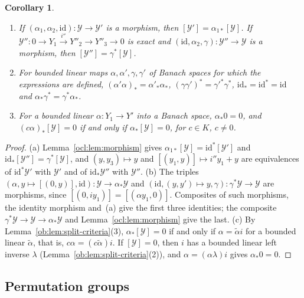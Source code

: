 \documentclass[11pt]{amsart}
\newtheorem{corollary}[theorem]{Corollary}
\theoremstyle{definition}
\theoremstyle{remark}
\numberwithin{equation}{section}
\newcommand{\id}{\mathrm{id}}
\theoremstyle{plain}
\theoremstyle{definition}
\theoremstyle{plain}
\begin{document}
\begin{corollary}\label{ocl:cor:functorial}
\begin{enumerate}
\item[(a)] If $(\alpha_1,\alpha_2,\id)\colon\mathcal Y\to\mathcal Y'$ is a morphism, then $[\mathcal
Y']=\alpha_{1*}[\mathcal Y]$. If $\mathcal Y''\colon0\to Y_1\xrightarrow{i''}Y''_2\to Y''_3\to0$ is exact and
$(\id,\alpha_2,\gamma)\colon\mathcal Y''\to\mathcal Y$ is a morphism, then $[\mathcal Y'']=\gamma^*[\mathcal Y]$.
\item[(b)] For bounded linear maps $\alpha,\alpha',\gamma,\gamma'$ of Banach spaces for which the expressions are defined,
$(\alpha'\alpha)_*=\alpha'_*\alpha_*$, $(\gamma\gamma')^*=\gamma'^*\gamma^*$, $\id_*=\id^*=\id$ and
$\alpha_*\gamma^*=\gamma^*\alpha_*$.
\item[(c)] For a bounded linear $\alpha\colon Y_1\to Y'$ into a Banach space, $\alpha_*0=0$, and $(c\alpha)_*[\mathcal
Y]=0$ if and only if $\alpha_*[\mathcal Y]=0$, for $c\in K$, $c\ne0$.
\end{enumerate}
\end{corollary}

\begin{proof}
(a) Lemma~\ref{ocl:lem:morphism} gives $\alpha_{1*}[\mathcal Y]=\id^*[\mathcal Y']$ and $\id_*[\mathcal
Y'']=\gamma^*[\mathcal Y]$, and $(y,y_3)\mapsto y$ and $[(y_1,y)]\mapsto i''y_1+y$ are equivalences of $\id^*\mathcal
Y'$ with $\mathcal Y'$ and of $\id_*\mathcal Y''$ with $\mathcal Y''$. (b) The triples
$(\alpha,y\mapsto[(0,y)],\id)\colon\mathcal Y\to\alpha_*\mathcal Y$ and $(\id,(y,y')\mapsto
y,\gamma)\colon\gamma^*\mathcal Y\to\mathcal Y$ are morphisms, since $[(0,iy_1)]=[(\alpha y_1,0)]$. Composites of such
morphisms, the identity morphism and~(a) give the first three identities; the composite $\gamma^*\mathcal Y\to\mathcal
Y\to\alpha_*\mathcal Y$ and Lemma~\ref{ocl:lem:morphism} give the last. (c) By Lemma~\ref{ob:lem:split-criteria}(3),
$\alpha_*[\mathcal Y]=0$ if and only if $\alpha=\tilde\alpha i$ for a bounded linear $\tilde\alpha$, that is,
$c\alpha=(c\tilde\alpha)i$. If $[\mathcal Y]=0$, then $i$ has a bounded linear left inverse $\lambda$
(Lemma~\ref{ob:lem:split-criteria}(2)), and $\alpha=(\alpha\lambda)i$ gives $\alpha_*0=0$.
\end{proof}

\subsection{Permutation groups}\label{ocl:ssec:permutations}
\end{document}
